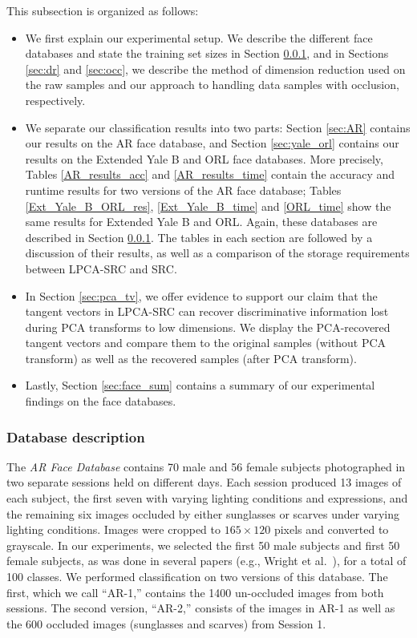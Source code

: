 \documentclass[review]{elsarticle}
\begin{document}
This subsection is organized as follows: 
\begin{itemize} [noitemsep,nolistsep]
\item We first explain our experimental setup. We describe the different face databases and state the training set sizes in Section \ref{sec:face_descript}, and in Sections \ref{sec:dr} and \ref{sec:occ}, we describe the method of dimension reduction used on the raw samples and our approach to handling data samples with occlusion, respectively. 

\item We separate our classification results into two parts: Section \ref{sec:AR} contains our results on the AR face database, and Section \ref{sec:yale_orl} contains our results on the Extended Yale B and ORL face databases. More precisely, Tables \ref{AR_results_acc} and \ref{AR_results_time} contain the accuracy and runtime results for two versions of the AR face database; Tables \ref{Ext_Yale_B_ORL_res}, \ref{Ext_Yale_B_time} and \ref{ORL_time} show the same results for Extended Yale B and ORL. Again, these databases are described in Section \ref{sec:face_descript}. The tables in each section are followed by a discussion of their results, as well as a comparison of the storage requirements between LPCA-SRC and SRC. 

\item In Section \ref{sec:pca_tv}, we offer evidence to support our claim that the tangent vectors in LPCA-SRC can recover discriminative information lost during PCA transforms to low dimensions. We display the PCA-recovered tangent vectors and compare them to the original samples (without PCA transform) as well as the recovered samples (after PCA transform). 

\item Lastly, Section \ref{sec:face_sum} contains a summary of our experimental findings on the face databases. 
\end{itemize}

\subsubsection{Database description} \label{sec:face_descript}

The \emph{AR Face Database} \cite{AR:face} contains 70 male and 56 female subjects photographed in two separate sessions held on different days. Each session produced 13 images of each subject, the first seven with varying lighting conditions and expressions, and the remaining six images occluded by either sunglasses or scarves under varying lighting conditions. Images were cropped to $165 \times 120$ pixels and converted to grayscale. In our experiments, we selected the first 50 male subjects and first 50 female subjects, as was done in several papers (e.g., Wright et al.\ \cite{wri:src}), for a total of 100 classes. We performed classification on two versions of this database. The first, which we call ``AR-1,'' contains the 1400 un-occluded images from both sessions. The second version, ``AR-2,'' consists of the images in AR-1 as well as the 600 occluded images (sunglasses and scarves) from Session 1.
\end{document}
